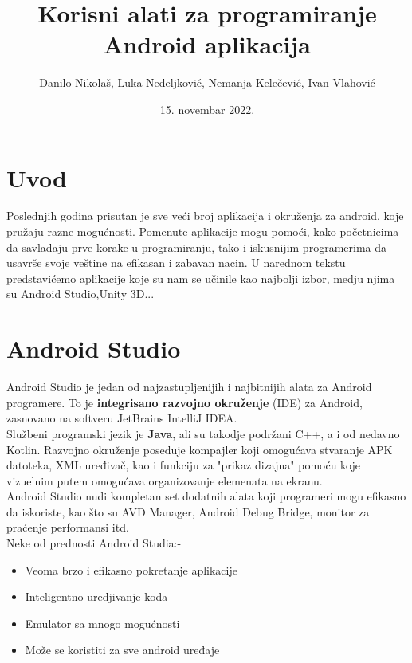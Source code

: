 \documentclass[12pt]{article}
\title{Korisni alati za programiranje Android aplikacija}
\author{Danilo Nikolaš, Luka Nedeljković, Nemanja Kelečević, Ivan Vlahović}
\date{15. novembar 2022.}
\begin{document}
\maketitle
\tableofcontents
\pagebreak

\section{Uvod}
Poslednjih godina prisutan je sve veći broj aplikacija i okruženja za android, koje pružaju razne mogućnosti.
Pomenute aplikacije mogu pomoći, kako početnicima da savladaju prve korake u programiranju, tako i iskusnijim programerima da usavrše svoje veštine na efikasan i zabavan nacin.
U narednom tekstu predstavićemo aplikacije koje su nam se učinile kao najbolji izbor, medju njima su Android Studio,Unity 3D... \

\section{Android Studio}
Android Studio je jedan od najzastupljenijih i najbitnijih alata za Android programere. To je \textbf{integrisano razvojno okruženje} (IDE) za Android, zasnovano na softveru JetBrains IntelliJ IDEA.  \\
\hspace*{1cm}Službeni programski jezik je \textbf{Java}, ali su takodje podržani C++, a i od nedavno Kotlin. Razvojno okruženje poseduje kompajler koji omogućava stvaranje APK datoteka, XML uređivač, kao i funkciju za "prikaz dizajna" pomoću koje vizuelnim putem omogućava organizovanje elemenata na ekranu. \\
\hspace*{1cm}Android Studio nudi kompletan set dodatnih alata koji programeri mogu efikasno da iskoriste, kao što su AVD Manager, Android Debug Bridge, monitor za praćenje performansi itd.\\
Neke od prednosti Android Studia:-
\begin{itemize}
\item{Veoma brzo i efikasno pokretanje aplikacije}
\item{Inteligentno uredjivanje koda} 
\item{Emulator sa mnogo mogućnosti}
\item{Može se koristiti za sve android uređaje}
\end{itemize}
\end{document}
